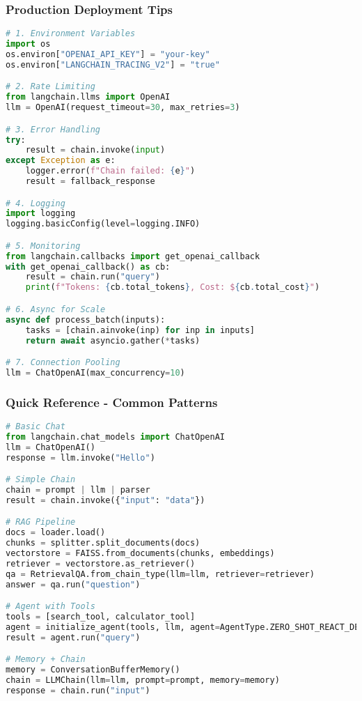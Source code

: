 \begin{frame}[fragile]\frametitle{Production Deployment Tips}
\begin{lstlisting}[language=python,basicstyle=\tiny]
# 1. Environment Variables
import os
os.environ["OPENAI_API_KEY"] = "your-key"
os.environ["LANGCHAIN_TRACING_V2"] = "true"

# 2. Rate Limiting
from langchain.llms import OpenAI
llm = OpenAI(request_timeout=30, max_retries=3)

# 3. Error Handling
try:
    result = chain.invoke(input)
except Exception as e:
    logger.error(f"Chain failed: {e}")
    result = fallback_response

# 4. Logging
import logging
logging.basicConfig(level=logging.INFO)

# 5. Monitoring
from langchain.callbacks import get_openai_callback
with get_openai_callback() as cb:
    result = chain.run("query")
    print(f"Tokens: {cb.total_tokens}, Cost: ${cb.total_cost}")

# 6. Async for Scale
async def process_batch(inputs):
    tasks = [chain.ainvoke(inp) for inp in inputs]
    return await asyncio.gather(*tasks)

# 7. Connection Pooling
llm = ChatOpenAI(max_concurrency=10)
\end{lstlisting}
\end{frame}

\begin{frame}[fragile]\frametitle{Quick Reference - Common Patterns}
\begin{lstlisting}[language=python,basicstyle=\tiny]
# Basic Chat
from langchain.chat_models import ChatOpenAI
llm = ChatOpenAI()
response = llm.invoke("Hello")

# Simple Chain
chain = prompt | llm | parser
result = chain.invoke({"input": "data"})

# RAG Pipeline
docs = loader.load()
chunks = splitter.split_documents(docs)
vectorstore = FAISS.from_documents(chunks, embeddings)
retriever = vectorstore.as_retriever()
qa = RetrievalQA.from_chain_type(llm=llm, retriever=retriever)
answer = qa.run("question")

# Agent with Tools
tools = [search_tool, calculator_tool]
agent = initialize_agent(tools, llm, agent=AgentType.ZERO_SHOT_REACT_DESCRIPTION)
result = agent.run("query")

# Memory + Chain
memory = ConversationBufferMemory()
chain = LLMChain(llm=llm, prompt=prompt, memory=memory)
response = chain.run("input")
\end{lstlisting}
\end{frame}